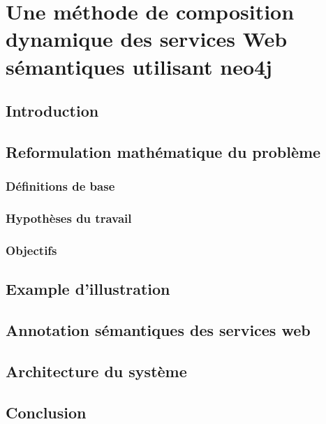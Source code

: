 \chapter{Une méthode de composition dynamique des services Web sémantiques utilisant neo4j}

\section*{Introduction}
 

\section{Reformulation mathématique du problème}
\label{sec:reform-du-probl}
  \subsection{Définitions de base}
  \label{sec:un-formalisme-pour}
  \subsection{Hypothèses du travail}
  \label{sec:hypotese-de-travail}
  \subsection{Objectifs}
  \label{objectifs}

\section{Example d'illustration}
\label{sec:example-dill}

\section{Annotation sémantiques des services web}
\label{sec:annot-semant-des}

\section{Architecture du système}
\label{sec:larch-du-syst}

\section*{Conclusion}
\label{sec:conclusion}
 


